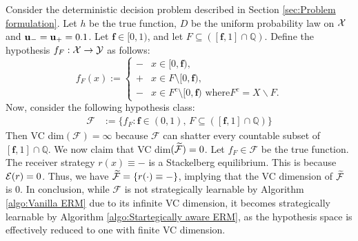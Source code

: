 \begin{exg}\label{exg:counter example}
Consider the deterministic decision problem described in Section \ref{sec:Problem formulation}. Let $h$ be the true function, $D$ be the uniform probability law on $\mathcal{X}$ and $\mathbf{u_-} = \mathbf{u_+} = 0.1$. Let $\mathbf{f} \in [0,1)$, and let $F \subseteq ([\mathbf{f},1] \cap \mathbb{Q})$. Define the hypothesis $f_F: \mathcal{X} \to \mathcal{Y}$ as follows:
\[
f_F(x) :=
\begin{cases}
    \minus & x \in [0, \mathbf{f}), \\
    \plus & x \in F \setminus [0, \mathbf{f}), \\
    \minus & x \in F^c \setminus [0, \mathbf{f}) \text{ where} F^c = X \backslash F.
\end{cases}
\]
Now, consider the following hypothesis class:
\[
\begin{aligned}
    \mathcal{F} &:= \{f_F : \mathbf{f} \in (0,1), \, F \subseteq ([\mathbf{f}, 1] \cap \mathbb{Q})\}
\end{aligned}
\]
Then VC dim$(\mathcal{F}) = \infty$ because $\mathcal{F}$ can shatter every countable subset of $[\mathbf{f}, 1] \cap \mathbb{Q}$. We now claim that VC dim$(\widetilde{\mathcal{F}}) = 0$. Let $f_F \in \mathcal{F}$ be the true function. The receiver strategy $r(x) \equiv \minus$ is a Stackelberg equilibrium. This is because $\mathcal{E}(r) = 0$.
Thus, we have \( \widetilde{\mathcal{F}} = \{r(\cdot) \equiv \mathbf{-}\} \), implying that the VC dimension of \( \widetilde{\mathcal{F}} \) is $0$. In conclusion, while \( \mathcal{F} \) is not strategically learnable by Algorithm \ref{algo:Vanilla ERM} due to its infinite VC dimension, it becomes strategically learnable by Algorithm \ref{algo:Startegically aware ERM}, as the hypothesis space is effectively reduced to one with finite VC dimension.
\end{exg}






